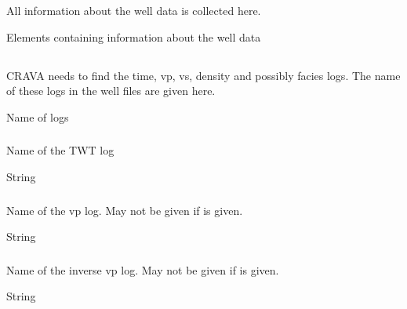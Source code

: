 
\section{} 
 \slist
   \item \Description All information about the well data is collected here.
   \item \Argument Elements containing information about the well data
   \item \Default
 \elist

\subsection{} 
 \slist
   \item \Description CRAVA needs to find the time, vp, vs, density and possibly facies logs. The name of these logs in the well files are given here.
   \item \Argument Name of logs
   \item \Default
 \elist

\subsubsection{} 
 \slist
   \item \Description Name of the TWT log
   \item \Argument String
   \item \Default %
 \elist

\subsubsection{}
 \slist
   \item \Description Name of the vp log. May not be given if  is given.
   \item \Argument String
   \item \Default
 \elist

\subsubsection{}
 \slist
   \item \Description Name of the inverse vp log. May not be given if  is given.
   \item \Argument String
   \item \Default %
 \elist

